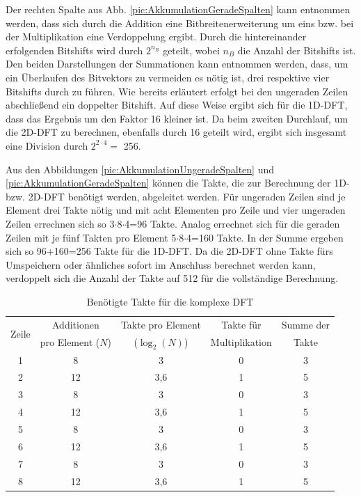 Der rechten Spalte aus Abb. \ref{pic:AkkumulationGeradeSpalten} kann entnommen werden, dass sich durch die Addition eine Bitbreitenerweiterung um eins bzw. bei der Multiplikation eine Verdoppelung ergibt. 
Durch die hintereinander erfolgenden Bitshifts wird durch $2^{n_B}$ geteilt, 
wobei $n_B$ die Anzahl der Bitshifts ist. Den beiden Darstellungen der Summationen kann entnommen werden, dass, um ein Überlaufen des Bitvektors zu vermeiden es nötig ist,
drei respektive vier Bitshifts durch zu führen. Wie bereits erläutert erfolgt bei den ungeraden Zeilen abschließend ein doppelter Bitshift. Auf diese Weise ergibt sich für die
1D-DFT, dass das Ergebnis um den Faktor 16 kleiner ist. Da beim zweiten Durchlauf, um die 2D-DFT zu berechnen, ebenfalls 
durch 16 geteilt wird, ergibt sich insgesamt eine Division durch $2^{2\cdot4} = $ 256.

Aus den Abbildungen \ref{pic:AkkumulationUngeradeSpalten} und \ref{pic:AkkumulationGeradeSpalten} können die Takte, die zur Berechnung der 1D- bzw. 2D-DFT benötigt werden, 
abgeleitet werden.
Für ungeraden Zeilen sind je Element drei Takte nötig und mit acht Elementen pro Zeile und vier ungeraden Zeilen errechnen sich so 3$\cdot$8$\cdot$4=96 Takte.
Analog errechnet sich für die geraden Zeilen mit je fünf Takten pro Element 5$\cdot$8$\cdot$4=160 Takte.
In der Summe ergeben sich so 96+160=256 Takte für die 1D-DFT. Da die 2D-DFT ohne Takte fürs Umspeichern oder ähnliches sofort im Anschluss berechnet werden kann, 
verdoppelt sich die Anzahl der Takte auf 512 für die vollständige Berechnung.

\begin{table}[ht!]
\centering
\caption{Benötigte Takte für die komplexe DFT}
\label{tab:TakteKomplexeDFT}
\begin{tabular}{ccccc}
\hline
\multirow{2}{*}{Zeile} & Additionen & Takte pro Element & Takte für & Summe der\\
      & pro Element ($N$) & ($\log_2(N)$) & Multiplikation & Takte\\
\hline
 1& 8  & 3   &0 &3\\
 2& 12 & 3,6 &1 &5\\
 3& 8  & 3   &0 &3\\
 4& 12 & 3,6 &1 &5\\
 5& 8  & 3   &0 &3\\
 6& 12 & 3,6 &1 &5\\
 7& 8  & 3   &0 &3\\
 8& 12 & 3,6 &1 &5\\
\hline
\end{tabular}
\end{table}

